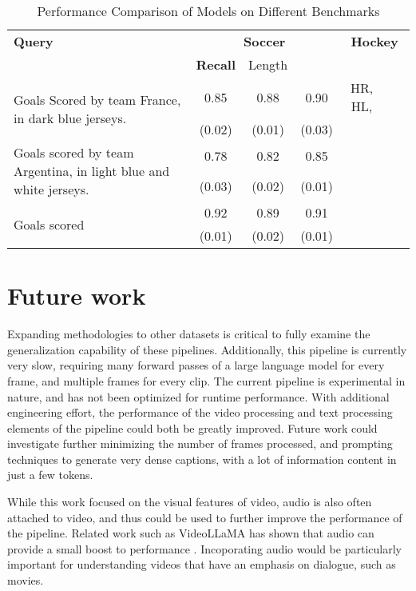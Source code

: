 \documentclass{article}
\begin{document}
\begin{table}[htbp]
  \centering
  \begin{tabular}{lccccc}
    \toprule
    \textbf{Query} & \multicolumn{3}{c}{\textbf{Soccer}} & \multicolumn{3}{c}{\textbf{Hockey}}\\
    \cmidrule(lr){2-4}
    & \textbf{Recall} & Length \\
    \midrule
    \multirow{2}{*}{Goals Scored by team France, in dark blue jerseys.} & 0.85 & 0.88 & 0.90 & HR, HL, \\
    & (0.02) & (0.01) & (0.03) \\
    \midrule
    \multirow{2}{*}{Goals scored by team Argentina, in light blue and white jerseys.} & 0.78 & 0.82 & 0.85 \\
    & (0.03) & (0.02) & (0.01) \\
    \midrule
    \multirow{2}{*}{Goals scored} & 0.92 & 0.89 & 0.91 \\
    & (0.01) & (0.02) & (0.01) \\
    \bottomrule
  \end{tabular}
  \label{tab:video_summarization}
  \caption{Performance Comparison of Models on Different Benchmarks}
\end{table}



\section{Future work}

Expanding methodologies to other datasets is critical to fully examine the generalization capability of these pipelines.
Additionally, this pipeline is currently very slow, requiring many forward passes of a large language model for every frame, and multiple frames for every clip.
The current pipeline is experimental in nature, and has not been optimized for runtime performance.
With additional engineering effort, the performance of the video processing and text processing elements of the pipeline could both be greatly improved.
Future work could investigate further minimizing the number of frames processed, and prompting techniques to generate very dense captions, with a lot of information content in just a few tokens.

While this work focused on the visual features of video, audio is also often attached to video, and thus could be used to further improve the performance of the pipeline.
Related work such as VideoLLaMA has shown that audio can provide a small boost to performance \cite{videollama}.
Incoporating audio would be particularly important for understanding videos that have an emphasis on dialogue, such as movies.
\end{document}
